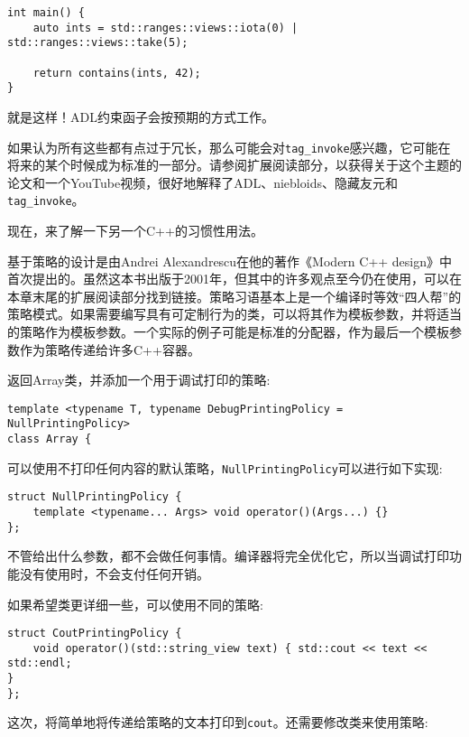 \begin{lstlisting}[style=styleCXX]
int main() {
	auto ints = std::ranges::views::iota(0) | std::ranges::views::take(5);
	
	return contains(ints, 42);
}
\end{lstlisting}

就是这样！ADL约束函子会按预期的方式工作。

如果认为所有这些都有点过于冗长，那么可能会对\texttt{tag\_invoke}感兴趣，它可能在将来的某个时候成为标准的一部分。请参阅扩展阅读部分，以获得关于这个主题的论文和一个YouTube视频，很好地解释了ADL、niebloids、隐藏友元和\texttt{tag\_invoke}。

现在，来了解一下另一个C++的习惯性用法。


基于策略的设计是由Andrei Alexandrescu在他的著作《Modern C++ design》中首次提出的。虽然这本书出版于2001年，但其中的许多观点至今仍在使用，可以在本章末尾的扩展阅读部分找到链接。策略习语基本上是一个编译时等效“四人帮”的策略模式。如果需要编写具有可定制行为的类，可以将其作为模板参数，并将适当的策略作为模板参数。一个实际的例子可能是标准的分配器，作为最后一个模板参数作为策略传递给许多C++容器。

返回Array类，并添加一个用于调试打印的策略:

\begin{lstlisting}[style=styleCXX]
template <typename T, typename DebugPrintingPolicy = NullPrintingPolicy>
class Array {
\end{lstlisting}

可以使用不打印任何内容的默认策略，\texttt{NullPrintingPolicy}可以进行如下实现:

\begin{lstlisting}[style=styleCXX]
struct NullPrintingPolicy {
	template <typename... Args> void operator()(Args...) {}
};
\end{lstlisting}

不管给出什么参数，都不会做任何事情。编译器将完全优化它，所以当调试打印功能没有使用时，不会支付任何开销。

如果希望类更详细一些，可以使用不同的策略:

\begin{lstlisting}[style=styleCXX]
struct CoutPrintingPolicy {
	void operator()(std::string_view text) { std::cout << text << std::endl;
}
};
\end{lstlisting}

这次，将简单地将传递给策略的文本打印到\texttt{cout}。还需要修改类来使用策略:

